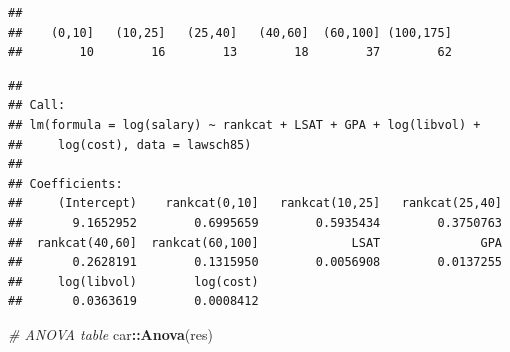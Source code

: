 \documentclass[]{book}
\newenvironment{Shaded}{\begin{snugshade}}{\end{snugshade}}
\newcommand{\CommentTok}[1]{\textcolor[rgb]{0.56,0.35,0.01}{\textit{#1}}}
\newcommand{\DataTypeTok}[1]{\textcolor[rgb]{0.13,0.29,0.53}{#1}}
\newcommand{\KeywordTok}[1]{\textcolor[rgb]{0.13,0.29,0.53}{\textbf{#1}}}
\newcommand{\NormalTok}[1]{#1}
\newcommand{\OperatorTok}[1]{\textcolor[rgb]{0.81,0.36,0.00}{\textbf{#1}}}
\newcommand{\StringTok}[1]{\textcolor[rgb]{0.31,0.60,0.02}{#1}}
\begin{document}
\begin{verbatim}
## 
##    (0,10]   (10,25]   (25,40]   (40,60]  (60,100] (100,175] 
##        10        16        13        18        37        62
\end{verbatim}

\begin{Shaded}
\begin{Highlighting}[]
\CommentTok{# Choose reference category}
\NormalTok{lawsch85}\OperatorTok{$}\NormalTok{rankcat <-}\StringTok{ }\KeywordTok{relevel}\NormalTok{(lawsch85}\OperatorTok{$}\NormalTok{rankcat,}\StringTok{"(100,175]"}\NormalTok{)}

\CommentTok{# Run regression}
\NormalTok{(res <-}\StringTok{ }\KeywordTok{lm}\NormalTok{(}\KeywordTok{log}\NormalTok{(salary)}\OperatorTok{~}\NormalTok{rankcat}\OperatorTok{+}\NormalTok{LSAT}\OperatorTok{+}\NormalTok{GPA}\OperatorTok{+}\KeywordTok{log}\NormalTok{(libvol)}\OperatorTok{+}\KeywordTok{log}\NormalTok{(cost), }\DataTypeTok{data=}\NormalTok{lawsch85))}
\end{Highlighting}
\end{Shaded}

\begin{verbatim}
## 
## Call:
## lm(formula = log(salary) ~ rankcat + LSAT + GPA + log(libvol) + 
##     log(cost), data = lawsch85)
## 
## Coefficients:
##     (Intercept)    rankcat(0,10]   rankcat(10,25]   rankcat(25,40]  
##       9.1652952        0.6995659        0.5935434        0.3750763  
##  rankcat(40,60]  rankcat(60,100]             LSAT              GPA  
##       0.2628191        0.1315950        0.0056908        0.0137255  
##     log(libvol)        log(cost)  
##       0.0363619        0.0008412
\end{verbatim}

\begin{Shaded}
\begin{Highlighting}[]
\CommentTok{# ANOVA table}
\NormalTok{car}\OperatorTok{::}\KeywordTok{Anova}\NormalTok{(res)}
\end{Highlighting}
\end{Shaded}

 
  \providecommand{\huxb}[2]{\arrayrulecolor[RGB]{#1}\global\arrayrulewidth=#2pt}
  \providecommand{\huxvb}[2]{\color[RGB]{#1}\vrule width #2pt}
  \providecommand{\huxtpad}[1]{\rule{0pt}{\baselineskip+#1}}
  \providecommand{\huxbpad}[1]{\rule[-#1]{0pt}{#1}}
\end{document}
